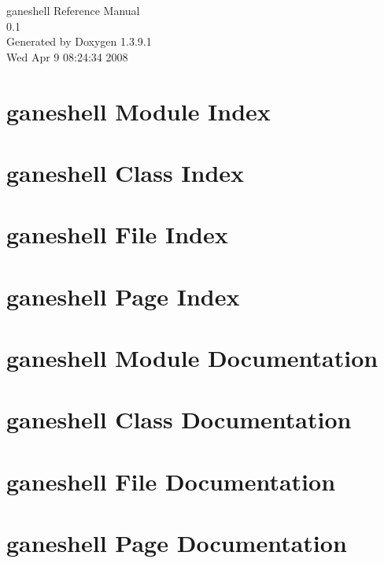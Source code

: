 \documentclass[a4paper]{book}
\begin{document}
\begin{titlepage}
\vspace*{7cm}
\begin{center}
{\Large ganeshell Reference Manual\\[1ex]\large 0.1 }\\
\vspace*{1cm}
{\large Generated by Doxygen 1.3.9.1}\\
\vspace*{0.5cm}
{\small Wed Apr 9 08:24:34 2008}\\
\end{center}
\end{titlepage}
\clearemptydoublepage
{}
\tableofcontents
\clearemptydoublepage
{}
\chapter{ganeshell Module Index}

\chapter{ganeshell Class Index}

\chapter{ganeshell File Index}

\chapter{ganeshell Page Index}

\chapter{ganeshell Module Documentation}


\chapter{ganeshell Class Documentation}














\chapter{ganeshell File Documentation}





















\chapter{ganeshell Page Documentation}

\printindex
\end{document}
